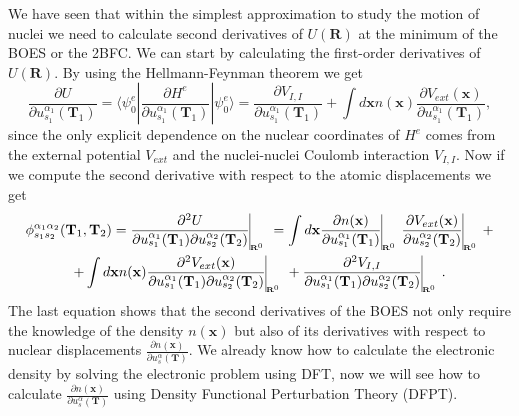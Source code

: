 We have seen that within the simplest approximation to study the motion of nuclei we need to calculate second derivatives of $U(\mathbf{R})$ at the minimum of the BOES or the 2BFC. We can start by calculating the 
first-order derivatives of $U(\mathbf{R})$. By using the Hellmann-Feynman theorem \cite{hellmann1937forces,feynman1939forces} we get
\begin{equation}
 \frac{\partial U}{\partial u_{s_{1}}^{\alpha_{1}}(\mathbf{T}_{1})}=\langle\psi_{0}^{e}|\frac{\partial H^{e}}{\partial u_{s_{1}}^{\alpha_{1}}(\mathbf{T}_{1})}|\psi_{0}^{e}\rangle=\frac{\partial V_{I,I}}{\partial u_{s_{1}}^{
 \alpha_{1}}(\mathbf{T}_{1})}+\int{d\mathbf{x}n(\mathbf{x})\frac{\partial V_{ext}(\mathbf{x})}{\partial u_{s_{1}}^{\alpha_{1}}(\mathbf{T}_{1})}},
\end{equation} 
since the only explicit dependence on the nuclear coordinates of $H^{e}$ comes from the external potential $V_{ext}$ and the nuclei-nuclei Coulomb interaction $V_{I,I}$. Now if we compute the 
second derivative with respect to the atomic displacements we get
\begin{multline}
 \phi_{s_{1}s_{2}}^{\alpha_{1}\alpha_{2}}(\mathbf{T}_{1},\mathbf{T}_{2})=\frac{\partial^{2}U}{\partial u_{s_{1}}^{\alpha_{1}}(\mathbf{T}_{1})\partial u_{s_{2}}^{\alpha_{2}}(\mathbf{T}_{2})}\vline_{_{_{_{_{_{_{_{_{\mathbf{R}^{
 0}}}}}}}}}} = \int{d\mathbf{x}\frac{\partial n(\mathbf{x})}{\partial u_{s_{1}}^{\alpha_{1}}(\mathbf{T}_{1})}\vline_{_{_{_{_{_{_{_{_{\mathbf{R}^{0}}}}}}}}}}}\frac{\partial V_{ext}(\mathbf{x})}{\partial u_{s_{2}}^{\alpha_{2}}(\mathbf{
 T}_{2})}\vline_{_{_{_{_{_{_{_{_{\mathbf{R}^{0}}}}}}}}}} + \\ + \int{d\mathbf{x}n(\mathbf{x})}\frac{\partial^{2}V_{ext}(\mathbf{x})}{\partial u_{s_{1}}^{\alpha_{1}}(\mathbf{T}_{1})\partial u_{s_{2}}^{\alpha_{2}}(\mathbf{T}_{
 2})}\vline_{_{_{_{_{_{_{_{_{\mathbf{R}^{0}}}}}}}}}} +  \frac{\partial^{2}V_{I,I}}{\partial u_{s_{1}}^{\alpha_{1}}(\mathbf{T}_{1})\partial u_{s_{2}}^{\alpha_{2}}(\mathbf{T}_{2})}\vline_{_{_{_{_{_{_{_{_{\mathbf{R}^{0}}}}}}}}}}. 
\end{multline}
The last equation shows that the second derivatives of the BOES not only require the knowledge of the density $n(\mathbf{x})$ but also of its derivatives with respect to nuclear 
displacements $\frac{\partial n(\mathbf{x})}{\partial u_{s}^{\alpha}(\mathbf{T})}$. We already know how to calculate the electronic density by solving the electronic problem using DFT, now we will see how to 
calculate $\frac{\partial n(\mathbf{x})}{\partial u_{s}^{\alpha}(\mathbf{T})}$ using Density Functional Perturbation Theory (DFPT)\cite{baroni1987green,gonze1995adiabatic,baroni2001phonons}. \\

